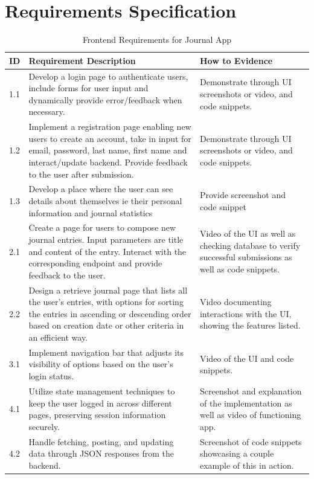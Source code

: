 \section{Requirements Specification}

\begin{table}[H]
\centering
\begin{tabular}{|l|p{8cm}|p{4cm}|}
\hline
\textbf{ID} & \textbf{Requirement Description} & \textbf{How to Evidence}\\ \hline
1.1 & Develop a login page to authenticate users, include forms for user input and dynamically provide error/feedback when necessary. & Demonstrate through UI screenshots or video, and code snippets. \\ \hline

1.2 & Implement a registration page enabling new users to create an account, take in input for email, password, last name, first name and interact/update backend. Provide feedback to the user after submission. & Demonstrate through UI screenshots or video, and code snippets.\\ \hline

1.3 & Develop a place where the user can see details about themselves ie their personal information and journal statistics & Provide screenshot and code snippet\\ \hline

2.1 & Create a page for users to compose new journal entries. Input parameters are title and content of the entry. Interact with the corresponding endpoint and provide feedback to the user.& Video of the UI as well as checking database to verify successful submissions as well as code snippets.\\ \hline

2.2 & Design a retrieve journal page that lists all the user’s entries, with options for sorting the entries in ascending or descending order based on creation date or other criteria in an efficient way. & Video documenting interactions with the UI, showing the features listed.\\ \hline

3.1 & Implement navigation bar that adjusts its visibility of options based on the user's login status. & Video of the UI and code snippets.\\ \hline

4.1 & Utilize state management techniques to keep the user logged in across different pages, preserving session information securely. & Screenshot and explanation of the implementation as well as video of functioning app.\\ \hline

4.2 & Handle fetching, posting, and updating data through JSON responses from the backend. & Screenshot of code snippets showcasing a couple example of this in action. \\ \hline
\end{tabular}
\caption{Frontend Requirements for Journal App}
\end{table}


